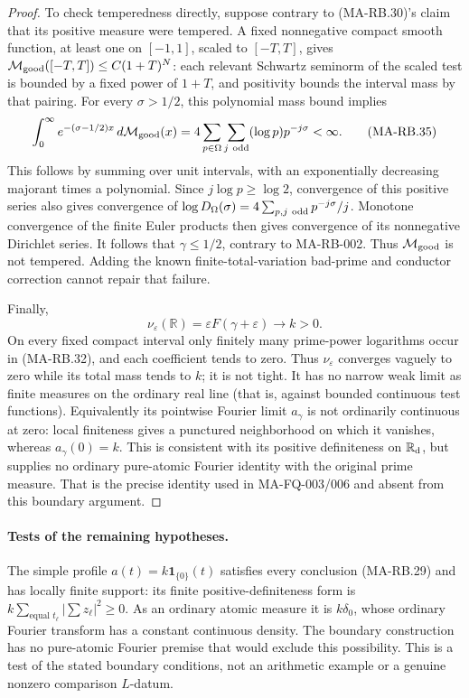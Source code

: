 \begin{proof}
To check temperedness directly, suppose contrary to
(MA-RB.30)'s claim that its positive measure were tempered.
A fixed nonnegative compact smooth function, at least one
on \([-1,1]\), scaled to \([-T,T]\), gives
\(\mathcal M_{\rm good}([-T,T])\le C(1+T)^N\):
each relevant Schwartz seminorm of the scaled test is
bounded by a fixed power of \(1+T\), and positivity
bounds the interval mass by that pairing.
For every \(\sigma>1/2\), this polynomial mass bound implies
\[
 \int_0^\infty e^{-(\sigma-1/2)x}\,d\mathcal M_{\rm good}(x)
       =4\sum_{p\in\Omega}\sum_{j\ {\rm odd}}
                               (\log p)p^{-j\sigma}<\infty .
 \tag{MA-RB.35}
\]
This follows by summing over unit intervals, with an
exponentially decreasing majorant times a polynomial.
Since \(j\log p\ge\log2\), convergence of this positive
series also gives convergence of
\(\log D_\Omega(\sigma)
 =4\sum_{p,j\ {\rm odd}}p^{-j\sigma}/j\).
Monotone convergence of the finite Euler products then
gives convergence of its nonnegative Dirichlet series.
It follows that \(\gamma\le1/2\), contrary to MA-RB-002.
Thus \(\mathcal M_{\rm good}\) is not tempered.
Adding the known finite-total-variation bad-prime and
conductor correction cannot repair that failure.

Finally,
\[
        \nu_\varepsilon(\mathbb R)
             =\varepsilon F(\gamma+\varepsilon)\longrightarrow k>0 .
 \tag{MA-RB.36}
\]
On every fixed compact interval only finitely many
prime-power logarithms occur in (MA-RB.32), and each
coefficient tends to zero.  Thus
\(\nu_\varepsilon\) converges vaguely to zero while
its total mass tends to \(k\); it is not tight.
It has no narrow weak limit as finite measures on the ordinary
real line (that is, against bounded continuous test functions).
Equivalently its pointwise Fourier limit
\(a_\gamma\) is not ordinarily continuous at zero:
local finiteness gives a punctured neighborhood on which
it vanishes, whereas \(a_\gamma(0)=k\).
This is consistent with its positive definiteness on
\(\mathbb R_{\rm d}\), but supplies no ordinary
pure-atomic Fourier identity with the original prime
measure.  That is the precise identity used in
MA-FQ-003/006 and absent from this boundary argument.
\end{proof}

\paragraph{Tests of the remaining hypotheses.}
The simple profile \(a(t)=k\mathbf1_{\{0\}}(t)\) satisfies
every conclusion (MA-RB.29) and has locally finite support:
its finite positive-definiteness form is
\(k\sum_{\text{equal }t_\ell}|\sum z_\ell|^2\ge0\).
As an ordinary atomic measure it is \(k\delta_0\),
whose ordinary Fourier transform has a constant
continuous density.  The boundary construction has no
pure-atomic Fourier premise that would exclude this
possibility.  This is a test of the stated boundary
conditions, not an arithmetic example or a genuine
nonzero comparison \(L\)-datum.


